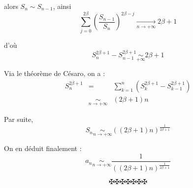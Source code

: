 alors $S_n \sim S_{n - 1}$, ainsi
\[ \sum_{j = 0}^{2 \beta} \left( \frac{S_{n - 1}}{S_n} \right)^{2 \beta - j}
   \underset{n \to + \infty}{\to} 2 \beta + 1 \]


d'o{\`u}
\[ S_n^{2 \beta + 1} - S_{n - 1}^{2 \beta + 1} \underset{+ \infty}{\sim} 2
   \beta + 1 \]


Via le th{\'e}or{\`e}me de C{\'e}saro, on a :
\begin{eqnarray*}
  S^{2 \beta + 1}_n & = & \sum_{k = 1}^n (S_k^{2 \beta + 1} - S_{k - 1}^{2
  \beta + 1})\\
  & \underset{n \to + \infty}{\sim} & (2 \beta + 1) n
\end{eqnarray*}


Par suite,
\[ S_n \underset{n \to + \infty}{\sim} ((2 \beta + 1) n)^{\frac{1}{2 \beta +
   1}} \]


On en d{\'e}duit finalement :
\[ a_n \underset{n \to + \infty}{\sim} \frac{1}{((2 \beta + 1) n)^{\frac{1}{2
   \beta + 1}}} \]

\[ \maltese \maltese \maltese \maltese \maltese \maltese \maltese \]
